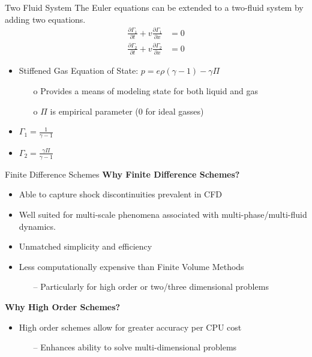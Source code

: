 \documentclass[9pt]{beamer}
\begin{document}
\begin{frame}{Two Fluid System}
  The Euler equations can be extended to a two-fluid system by adding two equations.
  \begin{align}
    \frac{\partial \Gamma_1 }{\partial t} + v\frac{\partial \Gamma_1}{\partial x}&=0\label{eq: Order Parameter One}\\
    \frac{\partial \Gamma_2 }{\partial t} + v\frac{\partial \Gamma_2}{\partial x}&=0\label{eq: Order Parameter Two}
  \end{align}

  \begin{itemize}
    \item Stiffened Gas Equation of State: $p = e\rho(\gamma - 1) -\gamma \Pi$
    \begin{itemize}
      \item[o] Provides a means of modeling state for both liquid and gas 
      \item[o] $\Pi$ is empirical parameter (0 for ideal gasses)  
    \end{itemize}
    \item $\Gamma_1 = \frac{1}{\gamma -1}$
    \item $\Gamma_2 = \frac{\gamma \Pi}{\gamma -1}$
  \end{itemize}

\end{frame}


\begin{frame}{Finite Difference Schemes}
\textbf{Why Finite Difference Schemes?}
\begin{itemize}
\item Able to capture shock discontinuities prevalent in CFD
\item Well suited for multi-scale phenomena associated with multi-phase/multi-fluid dynamics.
\item Unmatched simplicity and efficiency
\item Less computationally expensive than Finite Volume Methods
\begin{itemize}
\item[--] Particularly for high order or two/three dimensional problems \cite{FVFDComparison}
\end{itemize}
\end{itemize}
\textbf{Why High Order Schemes?}
\begin{itemize}
\item High order schemes allow for greater accuracy per CPU cost
\begin{itemize}
\item[--] Enhances ability to solve multi-dimensional problems
\end{itemize}
\end{itemize}
\end{frame}
\end{document}
